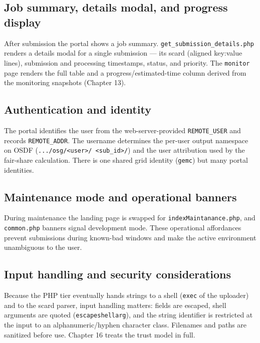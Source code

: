\subsection{Job summary, details modal, and progress display}

After submission the portal shows a job summary.
\texttt{get\_\allowbreak{}submission\_\allowbreak{}details.\allowbreak{}php} renders a details modal for a
single submission --- its scard (aligned key:value lines), submission and processing timestamps, status, and
priority. The \texttt{monitor} page renders the full table and a progress/estimated-time column derived from
the monitoring snapshots (Chapter 13).

\subsection{Authentication and identity}

The portal identifies the user from the web-server-provided \texttt{REMOTE\_\allowbreak{}USER} and records
\texttt{REMOTE\_\allowbreak{}ADDR}. The username determines the per-user output namespace on OSDF
(\texttt{.\allowbreak{}.\allowbreak{}.\allowbreak{}/\allowbreak{}osg/\allowbreak{}<user>/\allowbreak{}%
<sub\_\allowbreak{}id>/\allowbreak{}}) and the user attribution used by the fair-share calculation. There is
one shared grid identity (\texttt{gemc}) but many portal identities.

\subsection{Maintenance mode and operational banners}

During maintenance the landing page is swapped for \texttt{indexMaintanance.\allowbreak{}php}, and
\texttt{common.\allowbreak{}php} banners signal development mode. These operational affordances prevent
submissions during known-bad windows and make the active environment unambiguous to the user.

\subsection{Input handling and security considerations}

Because the PHP tier eventually hands strings to a shell (\texttt{exec} of the uploader) and to the scard
parser, input handling matters: fields are escaped, shell arguments are quoted (\texttt{escapeshellarg}), and
the string identifier is restricted at the input to an alphanumeric/hyphen character class. Filenames and paths
are sanitized before use. Chapter 16 treats the trust model in full.
